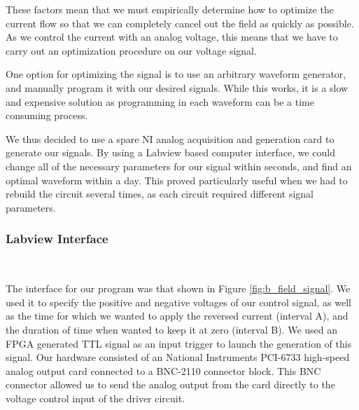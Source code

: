 These factors mean that we must empirically determine how to optimize the current flow so that we can completely cancel out the field as quickly as possible.  As we control the current with an analog voltage, this means that we have to carry out an optimization procedure on our voltage signal.

One option for optimizing the signal is to use an arbitrary waveform generator, and manually program it with our desired signals.  While this works, it is a slow and expensive solution as programming in each waveform can be a time consuming process. 

We thus decided to use a spare NI analog acquisition and generation card to generate our signals.  By using a Labview based computer interface, we could change all of the necessary parameters for our signal within seconds, and find an optimal waveform within a day.  This proved particularly useful when we had to rebuild the circuit several times, as each circuit required different signal parameters.


\subsubsection{Labview Interface}


\begin{sidewaysfigure}
  \centering
   \\
  \caption[B-Field control signal]{Labview interface and analog signal generated by DAC used to optimize the time to cut the B-field.}
  \label{fig:b_field_signal}
\end{sidewaysfigure}


The interface for our program was that shown in Figure
\ref{fig:b_field_signal}.  We used it to specify the positive and negative
voltages of our control signal, as well as the time for which we wanted to
apply the reversed current (interval A), and the duration of time when wanted
to keep it at zero (interval B).  We used an FPGA generated TTL signal as an
input trigger to launch the generation of this signal.  Our hardware consisted
of an National Instruments PCI-6733 high-speed analog output card connected to
a BNC-2110 connector block.  This BNC connector allowed us to send the analog
output from the card directly to the voltage control input of the driver circuit.



